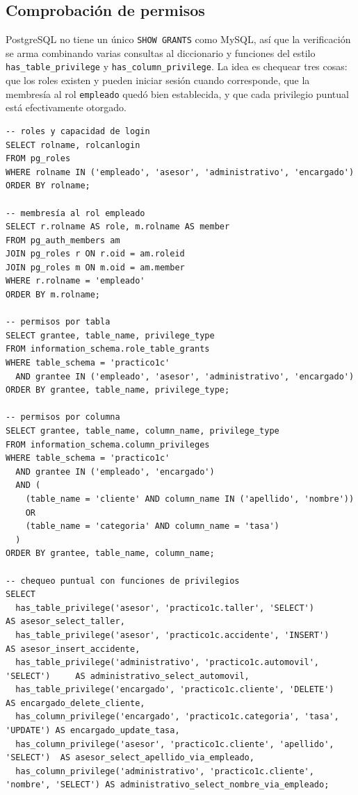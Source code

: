 \documentclass[11pt,a4paper]{article}
\begin{document}
\subsection{Comprobación de permisos}

PostgreSQL no tiene un único \texttt{SHOW GRANTS} como MySQL, así que la verificación se arma combinando varias consultas al diccionario y funciones del estilo \texttt{has\_table\_privilege} y \texttt{has\_column\_privilege}. La idea es chequear tres cosas: que los roles existen y pueden iniciar sesión cuando corresponde, que la membresía al rol \texttt{empleado} quedó bien establecida, y que cada privilegio puntual está efectivamente otorgado.

\begin{lstlisting}
-- roles y capacidad de login
SELECT rolname, rolcanlogin
FROM pg_roles
WHERE rolname IN ('empleado', 'asesor', 'administrativo', 'encargado')
ORDER BY rolname;

-- membresía al rol empleado
SELECT r.rolname AS role, m.rolname AS member
FROM pg_auth_members am
JOIN pg_roles r ON r.oid = am.roleid
JOIN pg_roles m ON m.oid = am.member
WHERE r.rolname = 'empleado'
ORDER BY m.rolname;

-- permisos por tabla
SELECT grantee, table_name, privilege_type
FROM information_schema.role_table_grants
WHERE table_schema = 'practico1c'
  AND grantee IN ('empleado', 'asesor', 'administrativo', 'encargado')
ORDER BY grantee, table_name, privilege_type;

-- permisos por columna
SELECT grantee, table_name, column_name, privilege_type
FROM information_schema.column_privileges
WHERE table_schema = 'practico1c'
  AND grantee IN ('empleado', 'encargado')
  AND (
    (table_name = 'cliente' AND column_name IN ('apellido', 'nombre'))
    OR
    (table_name = 'categoria' AND column_name = 'tasa')
  )
ORDER BY grantee, table_name, column_name;

-- chequeo puntual con funciones de privilegios
SELECT
  has_table_privilege('asesor', 'practico1c.taller', 'SELECT')                AS asesor_select_taller,
  has_table_privilege('asesor', 'practico1c.accidente', 'INSERT')             AS asesor_insert_accidente,
  has_table_privilege('administrativo', 'practico1c.automovil', 'SELECT')     AS administrativo_select_automovil,
  has_table_privilege('encargado', 'practico1c.cliente', 'DELETE')            AS encargado_delete_cliente,
  has_column_privilege('encargado', 'practico1c.categoria', 'tasa', 'UPDATE') AS encargado_update_tasa,
  has_column_privilege('asesor', 'practico1c.cliente', 'apellido', 'SELECT')  AS asesor_select_apellido_via_empleado,
  has_column_privilege('administrativo', 'practico1c.cliente', 'nombre', 'SELECT') AS administrativo_select_nombre_via_empleado;
\end{lstlisting}
\end{document}

